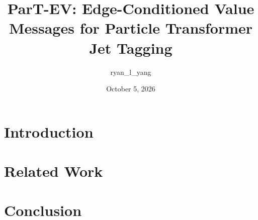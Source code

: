 \documentclass[11pt]{article}
\title{ParT-EV: Edge-Conditioned Value Messages for Particle Transformer Jet Tagging}
\author{ryan\_l\_yang}
\date{October 5, 2026}
\begin{document}
\maketitle

\section{Introduction}

\section{Related Work}



\clearpage

\clearpage

\section{Conclusion}



\clearpage
\appendix

\clearpage

\end{document}
